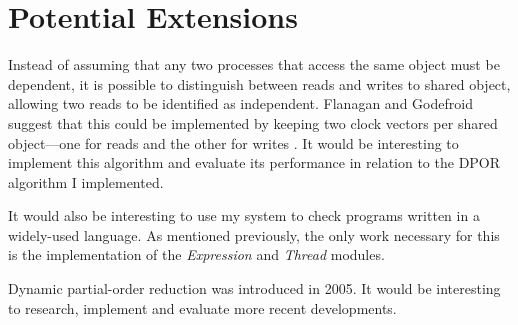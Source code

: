 \documentclass[12pt,a4paper,twoside,openright]{report}
\begin{document}
\section{Potential Extensions}
Instead of assuming that any
two processes that access the
same object must be dependent,
it is possible to distinguish
between reads and writes to
shared object, allowing
two reads to be identified
as independent.
Flanagan and Godefroid suggest
that this could be implemented
by keeping two clock vectors per
shared object---one for reads and
the other for writes \cite{flan05}.
It would
be interesting to implement
this algorithm and evaluate its
performance in relation to the
DPOR algorithm I implemented.

It would also be interesting
to use my system to check
programs written in a widely-used
language. As mentioned previously,
the only work necessary for this
is the implementation of the
\textit{Expression} and
\textit{Thread} modules.

Dynamic partial-order reduction
was introduced in 2005. It would
be interesting to research,
implement and evaluate more
recent developments.



\appendix
\end{document}
